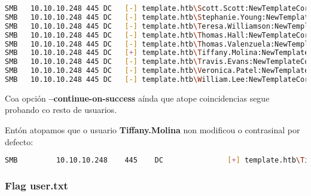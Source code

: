 \documentclass[a4paper]{article}
\begin{document}
\begin{lstlisting}[language=Bash, caption=Usuario/s con contrasinal por defecto, linewidth=18.7cm]
SMB   10.10.10.248 445 DC   [-] template.htb\Scott.Scott:NewTemplateCorpUser9876 STATUS_LOGON_FAILURE
SMB   10.10.10.248 445 DC   [-] template.htb\Stephanie.Young:NewTemplateCorpUser9876 STATUS_LOGON_FAILURE
SMB   10.10.10.248 445 DC   [-] template.htb\Teresa.Williamson:NewTemplateCorpUser9876 STATUS_LOGON_FAILURE
SMB   10.10.10.248 445 DC   [-] template.htb\Thomas.Hall:NewTemplateCorpUser9876 STATUS_LOGON_FAILURE
SMB   10.10.10.248 445 DC   [-] template.htb\Thomas.Valenzuela:NewTemplateCorpUser9876 STATUS_LOGON_FAILURE
SMB   10.10.10.248 445 DC   [+] template.htb\Tiffany.Molina:NewTemplateCorpUser9876
SMB   10.10.10.248 445 DC   [-] template.htb\Travis.Evans:NewTemplateCorpUser9876 STATUS_LOGON_FAILURE
SMB   10.10.10.248 445 DC   [-] template.htb\Veronica.Patel:NewTemplateCorpUser9876 STATUS_LOGON_FAILURE
SMB   10.10.10.248 445 DC   [-] template.htb\William.Lee:NewTemplateCorpUser9876 STATUS_LOGON_FAILURE\end{lstlisting}
        \begin{tcolorbox}[enhanced,attach boxed title to top center={yshift=-3mm,yshifttext=-1mm},
  colback=blue!5!white,colframe=blue!75!black,colbacktitle=green!80!black,
  title=De Interese,fonttitle=\bfseries,
  boxed title style={size=small,colframe=red!50!black} ]
        \centering
Coa opción \textbf{--continue-on-success} aínda que atope coincidencias segue probando co resto de usuarios.
\end{tcolorbox}


Entón atopamos que o usuario \textbf{Tiffany.Molina} non modificou o contrasinal por defecto:
        \begin{lstlisting}[language=Bash, caption=Usuario/s con contrasinal por defecto]
SMB         10.10.10.248    445    DC               [+] template.htb\Tiffany.Molina:NewTemplateCorpUser9876\end{lstlisting}

        \clearpage
        \subsubsection{Flag user.txt}
        \vspace{0.2cm}
\end{document}
